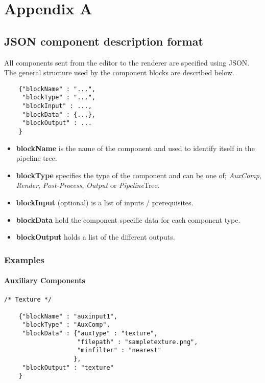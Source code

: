 \chapter{Appendix A}
\section{JSON component description format}
All components sent from the editor to the renderer are specified using JSON. The general
structure used by the component blocks are described below.

\begin{lstlisting}
    {"blockName" : "...",
     "blockType" : "...",
     "blockInput" : ...,
     "blockData" : {...},
     "blockOutput" : ...
    }
\end{lstlisting}

\begin{itemize}
\item{\textbf{blockName}} is the name of the component and used to identify itself in the pipeline tree.
\item{\textbf{blockType}} specifies the type of the component and can be one of; \textit{AuxComp}, \textit{Render}, \textit{Post-Process}, \textit{Output} or \textit{Pipeline}Tree.
\item{\textbf{blockInput}} (optional) is a list of inputs / prerequisites.
\item{\textbf{blockData}} hold the component specific data for each component type.
\item{\textbf{blockOutput}} holds a list of the different outputs.
\end{itemize}

\newpage

\subsection{Examples}
\subsubsection{Auxiliary Components}
\begin{lstlisting}
/* Texture */

    {"blockName" : "auxinput1",  
     "blockType" : "AuxComp",  
     "blockData" : {"auxType" : "texture",  
                    "filepath" : "sampletexture.png",  
                    "minfilter" : "nearest"  
                   },  
     "blockOutput" : "texture"  
    }  
\end{lstlisting}


